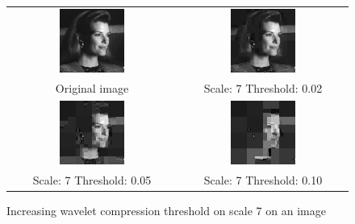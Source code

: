 \documentclass[a4paper]{article}
\begin{document}
\begin{enumerate}
\begin{figure}[H]
\centering
\begin{tabular}{cc}
 \includegraphics[width=0.4\textwidth]{../lab3ex3/tracy.png} & \includegraphics[width=0.4\textwidth]{../lab3ex3/l7t002.png} \\
 Original image & Scale: 7 Threshold: 0.02 \\
 \includegraphics[width=0.4\textwidth]{../lab3ex3/l7t005.png} & \includegraphics[width=0.4\textwidth]{../lab3ex3/l7t010.png}  \\
 Scale: 7 Threshold: 0.05 & Scale: 7 Threshold: 0.10 
\end{tabular}
\caption{Increasing wavelet compression threshold on scale 7 on an image}
\label{fig:scale7}
\end{figure}


\end{enumerate}
\end{document}
